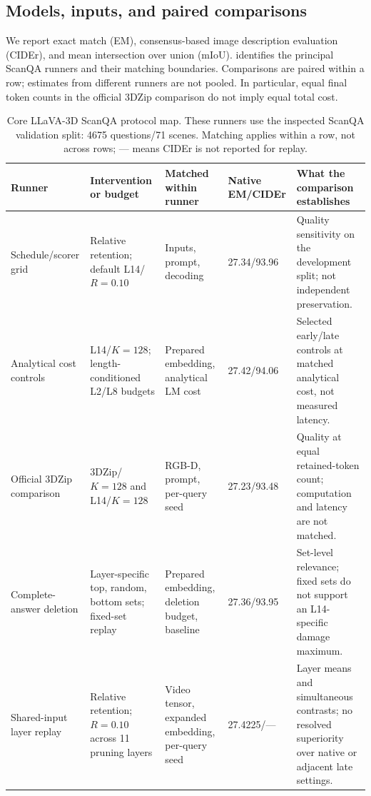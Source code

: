 \subsection{Models, inputs, and paired comparisons}
We report exact match (EM), consensus-based image description evaluation (CIDEr), and mean intersection over union (mIoU).
 identifies the principal ScanQA runners and their matching boundaries. Comparisons are paired within a row; estimates from different runners are not pooled. In particular, equal final token counts in the official 3DZip comparison do not imply equal total cost.
\begin{table}[t]
\centering
\small
\setlength{\tabcolsep}{4pt}
\caption{Core LLaVA-3D ScanQA protocol map. These runners use the inspected ScanQA validation split: 4675 questions/71 scenes. Matching applies within a row, not across rows; --- means CIDEr is not reported for replay.}
\label{tab:supp_protocolmap}
\begin{tabular}{@{}p{}p{}p{}p{}p{}@{}}
\toprule
Runner & Intervention or budget & Matched within runner & Native EM/CIDEr & What the comparison establishes \\
\midrule
Schedule/scorer grid & Relative retention; default L14/$R=0.10$ & Inputs, prompt, decoding & 27.34/93.96 & Quality sensitivity on the development split; not independent preservation. \\
Analytical cost controls & L14/$K=128$; length-conditioned L2/L8 budgets & Prepared embedding, analytical LM cost & 27.42/94.06 & Selected early/late controls at matched analytical cost, not measured latency. \\
Official 3DZip comparison & 3DZip/$K=128$ and L14/$K=128$ & RGB-D, prompt, per-query seed & 27.23/93.48 & Quality at equal retained-token count; computation and latency are not matched. \\
Complete-answer deletion & Layer-specific top, random, bottom sets; fixed-set replay & Prepared embedding, deletion budget, baseline & 27.36/93.95 & Set-level relevance; fixed sets do not support an L14-specific damage maximum. \\
Shared-input layer replay & Relative retention; $R=0.10$ across 11 pruning layers & Video tensor, expanded embedding, per-query seed & 27.4225/--- & Layer means and simultaneous contrasts; no resolved superiority over native or adjacent late settings. \\
\bottomrule
\end{tabular}
\end{table}

